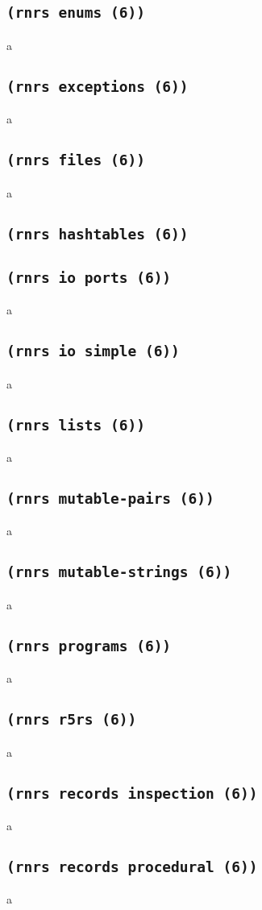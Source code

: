 \documentclass[onecolumn, 12pt, twoside, openright, dvipdfm]{book}
\begin{document}
\subsection{\texttt{(rnrs enums (6))}}
a
\subsection{\texttt{(rnrs exceptions (6))}}
a
\subsection{\texttt{(rnrs files (6))}}
a
\subsection{\texttt{(rnrs hashtables (6))}}
\cite{ghuloum07hashtables}

\subsection{\texttt{(rnrs io ports (6))}}
a
\subsection{\texttt{(rnrs io simple (6))}}
a
\subsection{\texttt{(rnrs lists (6))}}
a
\subsection{\texttt{(rnrs mutable-pairs (6))}}
a
\subsection{\texttt{(rnrs mutable-strings (6))}}
a
\subsection{\texttt{(rnrs programs (6))}}
a
\subsection{\texttt{(rnrs r5rs (6))}}
a
\subsection{\texttt{(rnrs records inspection (6))}}
a
\subsection{\texttt{(rnrs records procedural (6))}}
a
\end{document}
